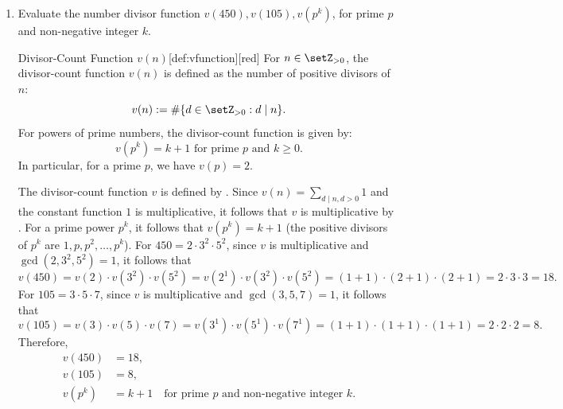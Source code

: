 \begin{enumerate}
\begin{subprove}
    Alternatively, this is verified using . 
    Let $f(n) = n$ and $g(d) = \phi(d)$. Then $f(n) = \sum_{d \mid n} g(d) = \sum_{d \mid n} \phi(d)$.
    By , it follows that
    \[
    g(n) = \sum_{d \mid n} \mu(d) f(n/d) = \sum_{d \mid n} \mu(d) \cdot \frac{n}{d} = n \sum_{d \mid n} \frac{\mu(d)}{d}.
    \]
    Since $\sum_{d \mid n} \frac{\mu(d)}{d} = \frac{\phi(n)}{n}$ for all $n \geq 1$, it follows that $g(n) = n \cdot \frac{\phi(n)}{n} = \phi(n)$, confirming that $f(n) = \sum_{d \mid n} \phi(d) = n$.
    Hence, $\sum_{d \mid n} \phi(d) = n$ for all integers $n \geq 1$.
  \end{subprove}




  \newpage
  \item Evaluate the number divisor function $v(450), v(105), v\left(p^{k}\right)$, 
  for prime $p$ and non-negative integer $k$.
  \begin{define}{Divisor-Count Function $v(n)$}[def:vfunction][red]
    For $n\in\setZ_{>0}$, the divisor-count function $v(n)$ is defined as the number of positive divisors of $n$:
    \[
    v(n):=\#\{d\in\setZ_{>0}:d\mid n\}.
    \]
    For powers of prime numbers, the divisor-count function is given by:
    \[
    v(p^k)=k+1 \text{ for prime } p \text{ and } k\geq 0.
    \]
    In particular, for a prime $p$, we have $v(p)=2$.
  \end{define}
  \begin{subanswer}
    The divisor-count function $v$ is defined by . 
    Since $v(n) = \sum_{d \mid n, d>0} 1$ and the constant function $1$ is multiplicative, it follows that $v$ is multiplicative by .
    For a prime power $p^k$, it follows that $v(p^k) = k+1$ (the positive divisors of $p^k$ are $1, p, p^2, \ldots, p^k$).
    For $450 = 2 \cdot 3^2 \cdot 5^2$, since $v$ is multiplicative and $\gcd(2, 3^2, 5^2) = 1$, it follows that
    \[
    v(450) = v(2) \cdot v(3^2) \cdot v(5^2) = v(2^1) \cdot v(3^2) \cdot v(5^2) = (1+1) \cdot (2+1) \cdot (2+1) = 2 \cdot 3 \cdot 3 = 18.
    \]
    For $105 = 3 \cdot 5 \cdot 7$, since $v$ is multiplicative and $\gcd(3, 5, 7) = 1$, it follows that
    \[
    v(105) = v(3) \cdot v(5) \cdot v(7) = v(3^1) \cdot v(5^1) \cdot v(7^1) = (1+1) \cdot (1+1) \cdot (1+1) = 2 \cdot 2 \cdot 2 = 8.
    \]
    Therefore,
    \begin{align*}
    v(450) &= 18,\\
    v(105) &= 8,\\
    v(p^k) &= k+1 \quad \text{for prime } p \text{ and non-negative integer } k.
    \end{align*}
  \end{subanswer}
  


\end{enumerate}
